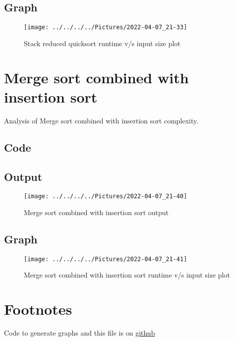 \documentclass{article}
\begin{document}
    \subsection{Graph}
    \begin{figure}[H]
        \centering
        \texttt{[image: ../../../../Pictures/2022-04-07\_21-33]}
        \caption{Stack reduced quicksort runtime v/s input size plot}
    \end{figure}

    \section{Merge sort combined with insertion sort}
    Analysis of Merge sort combined with insertion sort complexity.
    \subsection{Code}
    

    \subsection{Output}
    \begin{figure}[H]
        \centering
        \texttt{[image: ../../../../Pictures/2022-04-07\_21-40]}
        \caption{Merge sort combined with insertion sort output}
    \end{figure}

    \subsection{Graph}
    \begin{figure}[H]
        \centering
        \texttt{[image: ../../../../Pictures/2022-04-07\_21-41]}
        \caption{Merge sort combined with insertion sort runtime v/s input size plot}
    \end{figure}

    \section{Footnotes}
    Code to generate graphs and this file is on \href{https://github.com/pranavgade20/algos_complexity_benchmarker}{github}
\end{document}

